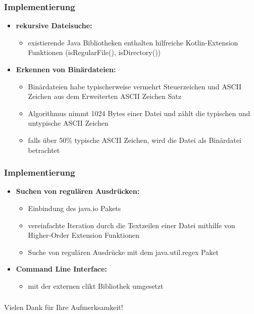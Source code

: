 \documentclass{beamer}
\begin{document}
\begin{frame}
\frametitle{Implementierung}
\begin{itemize}
\onehalfspacing
    \item \textbf{rekursive Dateisuche:}
    \begin{itemize}
        \item existierende Java Bibliotheken enthalten hilfreiche Kotlin-Extension Funktionen (isRegularFile(), isDirectory())
    \end{itemize}
    \item \textbf{Erkennen von Binärdateien:}
    \begin{itemize}
        \item Binärdateien habe typischerweise vermehrt Steuerzeichen und ASCII Zeichen aus dem Erweiterten ASCII Zeichen Satz
        \item Algorithmus nimmt 1024 Bytes einer Datei und zählt die typischen und untypische ASCII Zeichen
        \item falls über 50\% typische ASCII Zeichen, wird die Datei als Binärdatei betrachtet
    \end{itemize}
\end{itemize}
\end{frame}

\begin{frame}
\frametitle{Implementierung}
\onehalfspacing
\begin{itemize}
    \item \textbf{Suchen von regulären Ausdrücken:}
    \begin{itemize}
        \item Einbindung des java.io Pakets %
        \item vereinfachte Iteration durch die Textzeilen einer Datei mithilfe von Higher-Order Extension Funktionen
        \item Suche von regulären Ausdrücke mit dem java.util.regex Paket
    \end{itemize}

    \item \textbf{Command Line Interface:}
    \begin{itemize}
        \item mit der externen clikt Bibliothek umgesetzt
    \end{itemize}

\end{itemize}
\end{frame}




\begin{frame}
\frametitle{}
{\Large \centering Vielen Dank für Ihre Aufmerksamkeit!\par}
\end{frame}
\end{document}
